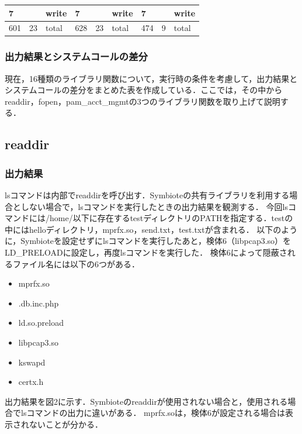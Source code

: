 \documentclass[submit,techreq,noauthor]{eco}	%
\begin{document}
\begin{table}[t]
\begin{tabular}{|lllllllll|}
  \multicolumn{1}{|l|}{7}     & \multicolumn{1}{l|}{}       & \multicolumn{1}{l|}{write}             & \multicolumn{1}{l|}{7}     & \multicolumn{1}{l|}{}       & \multicolumn{1}{l|}{write}             & \multicolumn{1}{l|}{7}     & \multicolumn{1}{l|}{}       & write             \\ \hline
  \multicolumn{1}{|l|}{601}   & \multicolumn{1}{l|}{23}     & \multicolumn{1}{l|}{total}             & \multicolumn{1}{l|}{628}   & \multicolumn{1}{l|}{23}     & \multicolumn{1}{l|}{total}             & \multicolumn{1}{l|}{474}   & \multicolumn{1}{l|}{9}      & total             \\ \hline
  \end{tabular}
  \end{table}

\subsubsection{出力結果とシステムコールの差分}
現在，16種類のライブラリ関数について，実行時の条件を考慮して，出力結果とシステムコールの差分をまとめた表を作成している．ここでは，その中からreaddir，fopen，pam\_acct\_mgmtの3つのライブラリ関数を取り上げて説明する．

\subsection{readdir}
\subsubsection{出力結果}
lsコマンドは内部でreaddirを呼び出す．Symbioteの共有ライブラリを利用する場合としない場合で，lsコマンドを実行したときの出力結果を観測する．
今回lsコマンドには/home/以下に存在するtestディレクトリのPATHを指定する．testの中にはhelloディレクトリ，mprfx.so，send.txt，test.txtが含まれる．
以下のように，Symbioteを設定せずにlsコマンドを実行したあと，検体6（libpcap3.so）をLD\_PRELOADに設定し，再度lsコマンドを実行した．
検体6によって隠蔽されるファイル名には以下の6つがある．
\begin{itemize}
  \item mprfx.so
  \item .db.inc.php
  \item ld.so.preload
  \item libpcap3.so
  \item kswapd
  \item certx.h
\end{itemize}
出力結果を図2に示す．Symbioteのreaddirが使用されない場合と，使用される場合でlsコマンドの出力に違いがある．
mprfx.soは，検体6が設定される場合は表示されないことが分かる．\\
\end{document}
